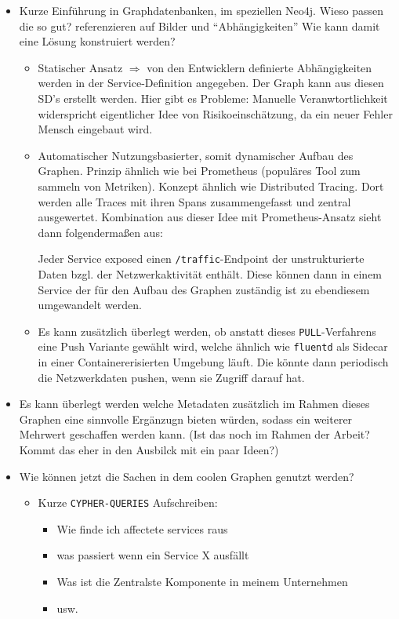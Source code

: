 \documentclass[
	12pt,
	BCOR=5mm,
	DIV=12,
	headinclude=on,
	footinclude=off,
	parskip=half,
	bibliography=totoc,
	listof=entryprefix,
	toc=listof,
	numbers=noenddot,
	plainfootsepline
]{scrreprt}
\begin{document}
\begin{itemize}
	\item Kurze Einführung in Graphdatenbanken, im speziellen Neo4j. Wieso passen die so gut? referenzieren auf Bilder und \enquote{Abhängigkeiten} Wie kann damit eine Lösung konstruiert werden?
	\begin{itemize}
		\item Statischer Ansatz $\Rightarrow$ von den Entwicklern definierte Abhängigkeiten werden in der Service-Definition angegeben. Der Graph kann aus diesen SD's erstellt werden. Hier gibt es Probleme: Manuelle Veranwtortlichkeit widerspricht eigentlicher Idee von Risikoeinschätzung, da ein neuer Fehler Mensch eingebaut wird.
		\item Automatischer Nutzungsbasierter, somit dynamischer Aufbau des Graphen. Prinzip ähnlich wie bei Prometheus (populäres Tool zum sammeln von Metriken). Konzept ähnlich wie Distributed Tracing. Dort werden alle Traces mit ihren Spans zusammengefasst und zentral ausgewertet. Kombination aus dieser Idee mit Prometheus-Ansatz sieht dann folgendermaßen aus:
		
		Jeder Service exposed einen \texttt{/traffic}-Endpoint der unstrukturierte Daten bzgl. der Netzwerkaktivität enthält. Diese können dann in einem Service der für den Aufbau des Graphen zuständig ist zu ebendiesem umgewandelt werden.
		\item Es kann zusätzlich überlegt werden, ob anstatt dieses \texttt{PULL}-Verfahrens eine Push Variante gewählt wird, welche ähnlich wie \texttt{fluentd} als Sidecar in einer Containererisierten Umgebung läuft. Die könnte dann periodisch die Netzwerkdaten pushen, wenn sie Zugriff darauf hat.
	\end{itemize}
	\item Es kann überlegt werden welche Metadaten zusätzlich im Rahmen dieses Graphen eine sinnvolle Ergänzugn bieten würden, sodass ein weiterer Mehrwert geschaffen werden kann. (Ist das noch im Rahmen der Arbeit? Kommt das eher in den Ausbilck mit ein paar Ideen?)
	\item Wie können jetzt die Sachen in dem coolen Graphen genutzt werden?
	\begin{itemize}
		\item Kurze \texttt{CYPHER-QUERIES} Aufschreiben:
		\begin{itemize}
			\item Wie finde ich affectete services raus
			\item was passiert wenn ein Service X ausfällt
			\item Was ist die Zentralste Komponente in meinem Unternehmen
			\item usw.
		\end{itemize}
	\end{itemize}
\end{itemize}
\end{document}

